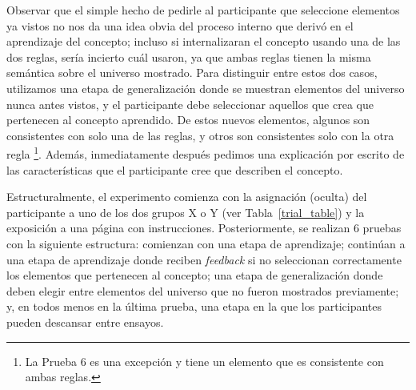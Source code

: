 Observar que el simple hecho de pedirle al participante que seleccione elementos ya vistos no nos da una idea obvia del proceso interno que derivó en el aprendizaje del concepto; incluso si internalizaran el concepto usando una de las dos reglas, sería incierto cuál usaron, ya que ambas reglas tienen la misma semántica sobre el universo mostrado. Para distinguir entre estos dos casos, utilizamos una etapa de generalización donde se muestran elementos del universo nunca antes vistos, y el participante debe seleccionar aquellos que crea que pertenecen al concepto aprendido. De estos nuevos elementos, algunos son consistentes con solo una de las reglas, y otros son consistentes solo con la otra regla \footnote{La Prueba 6 es una excepción y tiene un elemento que es consistente con ambas reglas.}. Además, inmediatamente después pedimos una explicación por escrito de las características que el participante cree que describen el concepto.

Estructuralmente, el experimento comienza con la asignación (oculta) del participante a uno de los dos grupos X o Y (ver Tabla~\ref{trial_table}) y la exposición a una página con instrucciones.
Posteriormente, se realizan 6 pruebas con la siguiente estructura: comienzan con una etapa de aprendizaje; continúan a una etapa de aprendizaje donde reciben {\em feedback} si no seleccionan correctamente los elementos que pertenecen al concepto; una etapa de generalización donde deben elegir entre elementos del universo que no fueron mostrados previamente; y, en todos menos en la última prueba, una etapa en la que los participantes pueden descansar entre ensayos.

